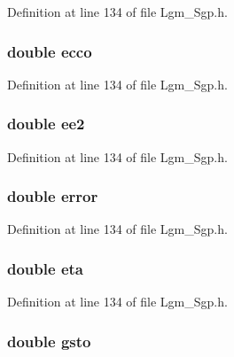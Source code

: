 Definition at line 134 of file Lgm\_\-Sgp.h.\hypertarget{struct___sgp_info_9c6fbcc6053a01f83f538705162576d1}{
\subsubsection[{ecco}]{\setlength{\rightskip}{0pt plus 5cm}double {\bf ecco}}}
\label{struct___sgp_info_9c6fbcc6053a01f83f538705162576d1}




Definition at line 134 of file Lgm\_\-Sgp.h.\hypertarget{struct___sgp_info_3907e33c8e58cb154a33174dd8e78179}{
\subsubsection[{ee2}]{\setlength{\rightskip}{0pt plus 5cm}double {\bf ee2}}}
\label{struct___sgp_info_3907e33c8e58cb154a33174dd8e78179}




Definition at line 134 of file Lgm\_\-Sgp.h.\hypertarget{struct___sgp_info_1ec236df65b93a338aecdf3fa64790f9}{
\subsubsection[{error}]{\setlength{\rightskip}{0pt plus 5cm}double {\bf error}}}
\label{struct___sgp_info_1ec236df65b93a338aecdf3fa64790f9}




Definition at line 134 of file Lgm\_\-Sgp.h.\hypertarget{struct___sgp_info_e4f402913d5fc5dd3aebca242ab26019}{
\subsubsection[{eta}]{\setlength{\rightskip}{0pt plus 5cm}double {\bf eta}}}
\label{struct___sgp_info_e4f402913d5fc5dd3aebca242ab26019}




Definition at line 134 of file Lgm\_\-Sgp.h.\hypertarget{struct___sgp_info_a25f72b7facd9726153a3161507fd71e}{
\subsubsection[{gsto}]{\setlength{\rightskip}{0pt plus 5cm}double {\bf gsto}}}
\label{struct___sgp_info_a25f72b7facd9726153a3161507fd71e}




